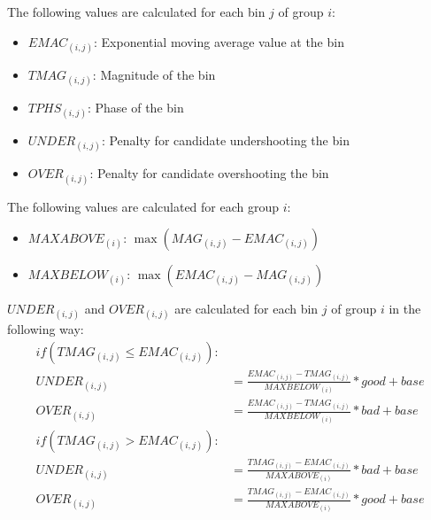 \documentclass[12pt]{article}
\begin{document}
The following values are calculated for each bin $j$ of group $i$:
\begin{itemize}
\addtolength{\itemindent}{1cm}
\vspace{-3mm}
\item $EMAC_{(i, j)}$: Exponential moving average value at the bin
\vspace{-3mm}
\item $TMAG_{(i, j)}$: Magnitude of the bin
\vspace{-3mm}
\item $TPHS_{(i, j)}$: Phase of the bin
\vspace{-3mm}
\item $UNDER_{(i, j)}$: Penalty for candidate undershooting the bin
\vspace{-3mm}
\item $OVER_{(i, j)}$: Penalty for candidate overshooting the bin
\vspace{-2mm}
\end{itemize}

The following values are calculated for each group $i$:
\begin{itemize}
\addtolength{\itemindent}{1cm}
\vspace{-3mm} 
\item $MAXABOVE_{(i)}$: $\max{(MAG_{(i, j)} - EMAC_{(i, j)})}$
\vspace{-3mm} 
\item $MAXBELOW_{(i)}$: $\max{(EMAC_{(i, j)} - MAG_{(i, j)})}$
\vspace{-2mm}
\end{itemize}

$UNDER_{(i, j)}$ and $OVER_{(i, j)}$ are calculated for each bin $j$ of group $i$ in the following way:
\vspace{-3mm} 
\begin{align*}
if (TMAG_{(i, j)} \le EMAC_{(i, j)}): \\
UNDER_{(i, j)} &= \frac{EMAC_{(i, j)} - TMAG_{(i, j)}}{MAXBELOW_{(i)}} * good + base \\
OVER_{(i, j)} &= \frac{EMAC_{(i, j)} - TMAG_{(i, j)}}{MAXBELOW_{(i)}} * bad + base \\
if (TMAG_{(i, j)} > EMAC_{(i, j)}): \\
UNDER_{(i, j)} &= \frac{TMAG_{(i, j)} - EMAC_{(i, j)}}{MAXABOVE_{(i)}} * bad + base \\
OVER_{(i, j)} &= \frac{TMAG_{(i, j)} - EMAC_{(i, j)}}{MAXABOVE_{(i)}} * good + base
\end{align*}
\vspace{-2mm}
\end{document}
